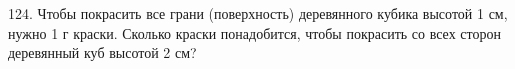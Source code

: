 124. Чтобы покрасить все грани (поверхность) деревянного кубика высотой 1 см, нужно 1 г краски. Сколько краски понадобится, чтобы покрасить со всех сторон деревянный куб высотой 2 см?\\
